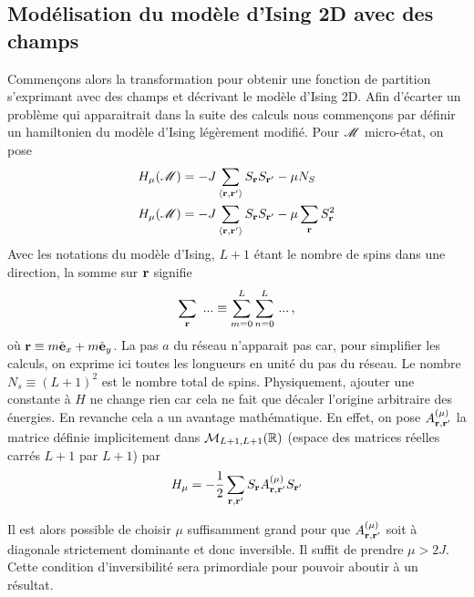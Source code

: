\documentclass[10.5pt]{article}
\begin{document}
\begin{multicols}{2}
\section{Modélisation du modèle d'Ising 2D avec des champs}


\label{ann:IsingChamp}

Commençons alors la transformation pour obtenir une fonction de partition s'exprimant avec des champs et décrivant le modèle d'Ising 2D. Afin d'écarter un problème qui apparaitrait dans la suite des calculs nous commençons par définir un hamiltonien du modèle d'Ising légèrement modifié. Pour $\mathscr{M}$ micro-état, on pose 
\begin{align}
  H_\mu(\mathscr{M}) &= -J \sum_{\left<{\bf r}, {\bf r}'\right>}S_{\bf r} S_{{\bf r}'} - \mu N_S \\
  H_\mu(\mathscr{M})   &= -J\sum_{\left<{\bf r}, {\bf r}'\right>}S_{\bf r} S_{{\bf r}'} - \mu \sum_{\bf r} S_{\bf r}^2 
\end{align}
Avec les notations du modèle d'Ising, $L+1$ étant le nombre de spins dans une direction, la somme sur ${\bf r}$ signifie
\begin{equation}
\sum_{\bf r} \,\, ... \equiv \sum_{m=0}^{L}\sum_{n=0}^{L} \, ... \, ,
\end{equation}
où ${\bf r} \equiv m\hat{\mathbf{e}}_x + m\hat{\mathbf{e}}_y$. La pas $a$ du réseau n'apparait pas car, pour simplifier les calculs, on exprime ici toutes les longueurs en unité du pas du réseau. Le nombre $N_s \equiv (L+1)^2$ est le nombre total de spins. Physiquement, ajouter une constante à $H$ ne change rien car cela ne fait que décaler l'origine arbitraire des énergies. En revanche cela a un avantage mathématique. En effet, on pose $A_{{\bf r}, {\bf r}'}^{(\mu)}$ la matrice définie implicitement dans $\mathcal{M}_{L+1, L+1}(\mathbb{R})$ (espace des matrices réelles carrés $L+1$ par $L+1$) par
\begin{equation}
  H_\mu  = -\frac{1}{2} \sum_{{\bf r}, {\bf r}'} S_{\bf r} A_{{\bf r}, {\bf r}'}^{(\mu)}S_{{\bf r}'}
\end{equation}

Il est alors possible de choisir $\mu$ suffisamment grand pour que $A_{{\bf r}, {\bf r}'}^{(\mu)}$ soit à diagonale strictement dominante et donc inversible. Il suffit de prendre $\mu > 2J$. Cette condition d'inversibilité sera primordiale pour pouvoir aboutir à un résultat.\\



\end{multicols}
\end{document}
